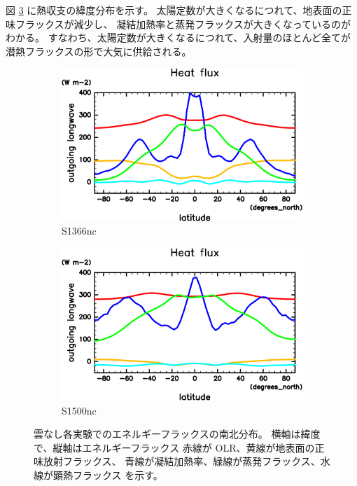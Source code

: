 \documentclass[body]{subfiles}
\begin{document}
\afterpage{\clearpage}

図 \ref{EnFlx南北分布nc} に熱収支の緯度分布を示す。
太陽定数が大きくなるにつれて、地表面の正味フラックスが減少し、
凝結加熱率と蒸発フラックスが大きくなっているのがわかる。
すなわち、太陽定数が大きくなるにつれて、入射量のほとんど全てが
潜熱フラックスの形で大気に供給される。

\begin{figure}[t]
	\centering
	\begin{subfigure}{.4\textwidth}
		\centering
		\includegraphics[width=\textwidth]{S1366-nc/HeatFlx,time=3650:4015-crop-rotate.pdf}
		\caption{S1366nc}\label{EnFlx南北分布S1366nc}
	\end{subfigure}
	\begin{subfigure}{.4\textwidth}
		\centering
		\includegraphics[width=\textwidth]{S1500-nc/HeatFlx,time=3650:4015-crop-rotate.pdf}
		\caption{S1500nc}\label{EnFlx南北分布S1500nc}
	\end{subfigure}
	\caption[雲なし各実験でのエネルギーフラックス南北分布]{
		雲なし各実験でのエネルギーフラックスの南北分布。
		横軸は緯度で、縦軸はエネルギーフラックス\hmu*{[W/m^{-2}]}
		赤線が OLR、黄線が地表面の正味放射フラックス、
		青線が凝結加熱率、緑線が蒸発フラックス、水線が顕熱フラックス
		を示す。
	}\label{EnFlx南北分布nc}
\end{figure}
\end{document}

